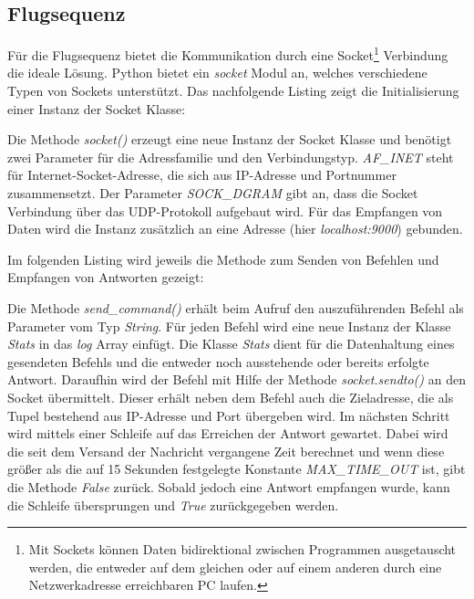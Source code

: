 \subsection*{Flugsequenz}
Für die Flugsequenz bietet die Kommunikation durch eine Socket\footnote{Mit Sockets können Daten bidirektional zwischen  Programmen ausgetauscht werden, die entweder auf dem gleichen oder auf einem anderen durch eine Netzwerkadresse erreichbaren PC laufen.} Verbindung die ideale Lösung. Python bietet ein \textit{socket} Modul an, welches verschiedene Typen von Sockets unterstützt. Das nachfolgende Listing zeigt die Initialisierung einer Instanz der Socket Klasse:



Die Methode \textit{socket()} erzeugt eine neue Instanz der Socket Klasse und benötigt zwei Parameter für die Adressfamilie und den Verbindungstyp. \textit{AF\_INET} steht für Internet-Socket-Adresse, die sich aus IP-Adresse und Portnummer zusammensetzt. Der Parameter \textit{SOCK\_DGRAM} gibt an, dass die Socket Verbindung über das UDP-Protokoll aufgebaut wird. Für das Empfangen von Daten wird die Instanz zusätzlich an eine Adresse (hier \textit{localhost:9000}) gebunden.

Im folgenden Listing wird jeweils die Methode zum Senden von Befehlen und Empfangen von Antworten gezeigt:



Die Methode \textit{send\_command()} erhält beim Aufruf den auszuführenden Befehl als Parameter vom Typ \textit{String}. Für jeden Befehl wird eine neue Instanz der Klasse \textit{Stats} in das \textit{log} Array einfügt. Die Klasse \textit{Stats} dient für die Datenhaltung eines gesendeten Befehls und die entweder noch ausstehende oder bereits erfolgte Antwort. Daraufhin wird der Befehl mit Hilfe der Methode \textit{socket.sendto()} an den Socket übermittelt. Dieser erhält neben dem Befehl auch die Zieladresse, die als Tupel bestehend aus IP-Adresse und Port übergeben wird. Im nächsten Schritt wird mittels einer Schleife auf das Erreichen der Antwort gewartet. Dabei wird die seit dem Versand der Nachricht vergangene Zeit berechnet und wenn diese größer als die auf 15 Sekunden festgelegte Konstante \textit{MAX\_TIME\_OUT} ist, gibt die Methode \textit{False} zurück. Sobald jedoch eine Antwort empfangen wurde, kann die Schleife übersprungen und \textit{True} zurückgegeben werden.

